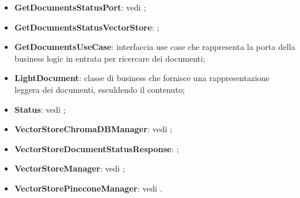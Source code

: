 \documentclass[10pt, a4paper]{article}
\begin{document}
\begin{itemize}
     \item \textbf{GetDocumentsStatusPort}: vedi ;
    \item \textbf{GetDocumentsStatusVectorStore}: ;
     \item \label{GetDocumentsUseCase}\textbf{GetDocumentsUseCase}: interfaccia use case che rappresenta la porta della business logic in entrata per ricercare dei documenti;
     \item \label{LightDocument}\textbf{LightDocument}: classe di business che fornisce una rappresentazione leggera dei documenti, esculdendo il contenuto;
    \item \textbf{Status}: vedi ;    
    \item \textbf{VectorStoreChromaDBManager}: vedi ;
    \item \textbf{VectorStoreDocumentStatusResponse}: ;
    \item \textbf{VectorStoreManager}: vedi ;
    
    \item \textbf{VectorStorePineconeManager}: vedi .
    
\end{itemize}
\end{document}
